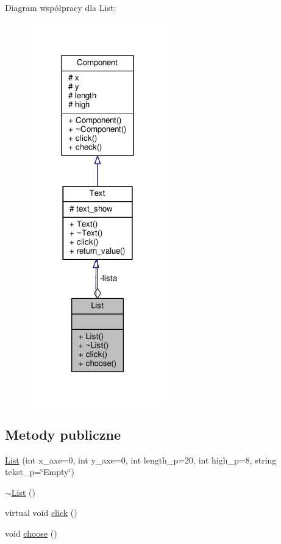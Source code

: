 Diagram współpracy dla List\+:\nopagebreak
\begin{figure}[H]
\begin{center}
\leavevmode
\includegraphics[width=168pt]{classList__coll__graph}
\end{center}
\end{figure}
\subsection*{Metody publiczne}
\begin{DoxyCompactItemize}
\item 
\hyperlink{classList_a461d7b92539ae6cd32801a93ef25c770}{List} (int x\+\_\+axe=0, int y\+\_\+axe=0, int length\+\_\+p=20, int high\+\_\+p=8, string tekst\+\_\+p=\char`\"{}Empty\char`\"{})
\item 
\hyperlink{classList_a70aecf37bd9d779a394e4d50377fbf5f}{$\sim$\+List} ()
\item 
virtual void \hyperlink{classList_a72af1f829c9b4ca5ee3cb3eaae52cf9a}{click} ()
\item 
void \hyperlink{classList_a0fd3881c847af3dd93bbc1927c2fff46}{choose} ()
\end{DoxyCompactItemize}
